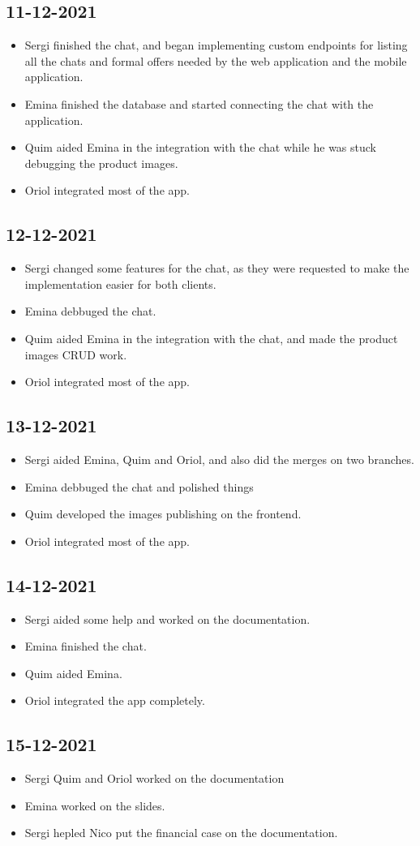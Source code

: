 \documentclass[./main.tex]{subfiles}
\begin{document}
\subsection{11-12-2021}
\begin{itemize}
	\item Sergi finished the chat, and began implementing custom endpoints for listing all the chats and formal offers needed by the web application and the mobile application.
	\item Emina finished the database and started connecting the chat with the application.
	\item Quim aided Emina in the integration with the chat while he was stuck debugging the product images.
	\item Oriol integrated most of the app.
\end{itemize}

\subsection{12-12-2021}
\begin{itemize}
	\item Sergi changed some features for the chat, as they were requested to make the implementation easier for both clients.
	\item Emina debbuged the chat.
	\item Quim aided Emina in the integration with the chat, and made the product images CRUD work.
	\item Oriol integrated most of the app.
\end{itemize}

\subsection{13-12-2021}
\begin{itemize}
	\item Sergi aided Emina, Quim and Oriol, and also did the merges on two branches.
	\item Emina debbuged the chat and polished things
	\item Quim developed the images publishing on the frontend.
	\item Oriol integrated most of the app.
\end{itemize}

\subsection{14-12-2021}
\begin{itemize}
	\item Sergi aided some help and worked on the documentation.
	\item Emina finished the chat.
	\item Quim aided Emina.
	\item Oriol integrated the app completely.
\end{itemize}


\subsection{15-12-2021}
\begin{itemize}
	\item Sergi Quim and Oriol worked on the documentation
	\item Emina worked on the slides.
	\item Sergi hepled Nico put the financial case on the documentation.
\end{itemize}
\end{document}
